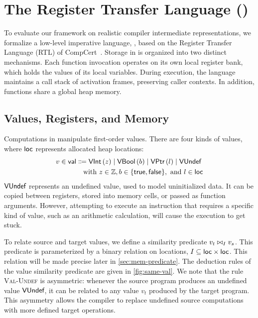 \documentclass[report.tex]{subfiles}
\begin{document}
\section{The Register Transfer Language (\muRTL{})}
\label{sec:rtl}

To evaluate our framework on realistic compiler intermediate
representations,
we formalize a low-level imperative language,
\muRTL{},
based on the Register Transfer Language (RTL)
of CompCert~\parencite{leroy-09-compcert}.
Storage in \muRTL{} is organized into two distinct mechanisms.
Each function invocation operates on its own local register bank,
which holds the values of its local variables.
During execution,
the language maintains a call stack of activation frames,
preserving caller contexts.
In addition,
functions share a global heap memory.

\subsection{Values, Registers, and Memory}
\label{sec:rtl-val-mem}

Computations in \muRTL{} manipulate first-order values.
There are four kinds of values,
where $\loc$ represents allocated heap locations:
\begin{align*}
  v \in \val
  &
    \Coloneqq \VInt{z} \mid \VBool{b} \mid \VPtr{l} \mid \VUndef
  \\
  &
    \quad \text{with } z \in \mathbb{Z},
    b \in \{\true, \false\},
    \text{ and } l \in \loc
\end{align*}
$\VUndef$ represents an undefined value,
used to model uninitialized data.
It can be copied between registers,
stored into memory cells,
or passed as function arguments.
However,
attempting to execute an instruction that requires a specific kind of value,
such as an arithmetic calculation,
will cause the execution to get stuck.

To relate source and target values,
we define a similarity predicate $\sameval{I}{v_t}{v_s}$.
This predicate is parameterized by a binary relation on locations,
$I \subseteq \loc \times \loc$.
This relation will be made precise later in \cref{sec:mem-predicate}.
The deduction rules of the value similarity predicate are given in
\cref{fig:same-val}.
We note that the rule \textsc{Val-Undef} is asymmetric:
whenever the source program produces an undefined value $\VUndef$,
it can be related to any value $v_t$ produced by the target program.
This asymmetry allows the compiler to replace undefined source computations with
more defined target operations.
\end{document}
